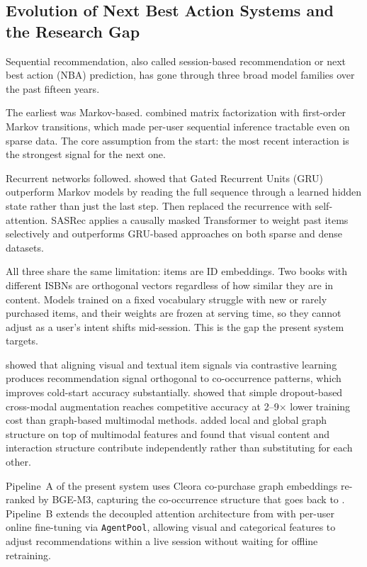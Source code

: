 
\subsection{Evolution of Next Best Action Systems and the Research Gap}
\label{subsec:nba-evolution}

Sequential recommendation, also called session-based recommendation or next best action (NBA) prediction, has gone through three broad model families over the past fifteen years.

The earliest was Markov-based. \cite{rendle2010fpmc} combined matrix factorization with first-order Markov transitions, which made per-user sequential inference tractable even on sparse data. The core assumption from the start: the most recent interaction is the strongest signal for the next one.

Recurrent networks followed. \cite{hidasi2016gru4rec} showed that Gated Recurrent Units (GRU) outperform Markov models by reading the full sequence through a learned hidden state rather than just the last step. Then \cite{kang2018self} replaced the recurrence with self-attention. SASRec applies a causally masked Transformer to weight past items selectively and outperforms GRU-based approaches on both sparse and dense datasets.

All three share the same limitation: items are ID embeddings. Two books with different ISBNs are orthogonal vectors regardless of how similar they are in content. Models trained on a fixed vocabulary struggle with new or rarely purchased items, and their weights are frozen at serving time, so they cannot adjust as a user's intent shifts mid-session. This is the gap the present system targets.

\cite{wei2023mmssl} showed that aligning visual and textual item signals via contrastive learning produces recommendation signal orthogonal to co-occurrence patterns, which improves cold-start accuracy substantially. \cite{zhou2023bm3} showed that simple dropout-based cross-modal augmentation reaches competitive accuracy at 2--9$\times$ lower training cost than graph-based multimodal methods. \cite{guo2024lgmrec} added local and global graph structure on top of multimodal features and found that visual content and interaction structure contribute independently rather than substituting for each other.

Pipeline~A of the present system uses Cleora co-purchase graph embeddings re-ranked by BGE-M3, capturing the co-occurrence structure that goes back to \cite{rendle2010fpmc}. Pipeline~B extends the decoupled attention architecture from \cite{xie2022difsasrec} with per-user online fine-tuning via \texttt{AgentPool}, allowing visual and categorical features to adjust recommendations within a live session without waiting for offline retraining.
